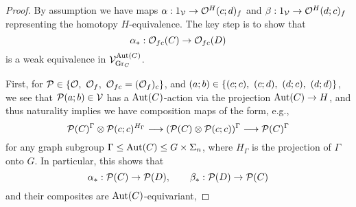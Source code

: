 \documentclass[a4paper,10pt
,draft
]{article}%
\renewcommand{\1}{\eta}%
\begin{document}
\begin{proof}
      By assumption we have maps
      $\alpha: 1_{\mathcal V} \to \mathcal{O}^H(c;d)_f$ and $\beta: 1_{\mathcal V} \to \mathcal{O}^H(d;c)_f$
      representing the homotopy $H$-equivalence.
      The key step is to show that
      \begin{equation}
            \label{ALPHAS_EQ}
            \alpha_{\**}: \O_{f c}(C) \to \O_{f c}(D)
      \end{equation}
      is a weak equivalence in $\mathcal V^{\operatorname{Aut}(C)}_{\mathrm{Gr}_C}$.
      
      First, for $\mathcal{P} \in \left\{ \mathcal{O},\ \mathcal{O}_f,\ \mathcal{O}_{f c} = (\mathcal{O}_f)_c\right\}$,
      and $(a;b) \in \left\{(c;c),\ (c;d),\ (d;c),\ (d;d)\right\}$,
      we see that $\mathcal{P}(a;b) \in \mathcal V$ has a $\operatorname{Aut}(C)$-action
      via the projection $\operatorname{Aut}(C) \to H$,
      and thus naturality implies we have composition maps of the form, e.g., 
      \begin{equation}
            \label{AUTCCOMP_EQ}
            \P(C)^\Gamma \otimes \P(c;c)^{H_\Gamma} \longrightarrow
            (\P(C) \otimes \P(c;c))^\Gamma \longrightarrow
            \P(C)^\Gamma
      \end{equation}
      for any graph subgroup $\Gamma \leq \operatorname{Aut}(C) \leq G \times \Sigma_n$,
      where $H_\Gamma$ is the projection of $\Gamma$ onto $G$.
      In particular, this shows that
      \begin{equation}
            \alpha_{\**}: \P(C) \to \P(D),
            \qquad
            \beta_{\**}: \P(D) \to \P(C)
      \end{equation}
      and their composites are $\operatorname{Aut}(C)$-equivariant,
      

\end{proof}
\end{document}
